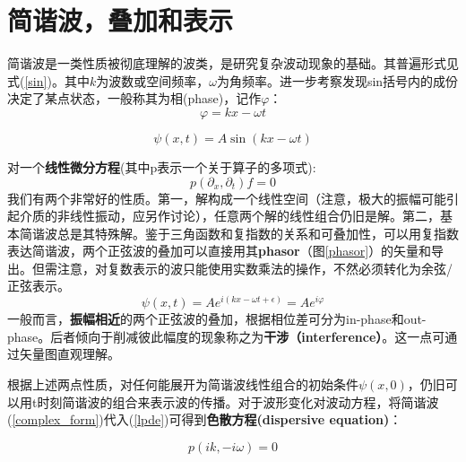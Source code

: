 \documentclass[12pt]{ctexart}%
\begin{document}
\section*{简谐波，叠加和表示}
简谐波是一类性质被彻底理解的波类，是研究复杂波动现象的基础。其普遍形式见式(\ref{sin})。其中$k$为波数或空间频率，$\omega$为角频率。进一步考察发现sin括号内的成份决定了某点状态，一般称其为相(phase)，记作$\varphi$：
\begin{equation}
    \varphi=kx-\omega t
\end{equation}

\begin{framed}
\begin{equation}
    \psi(x,t)=A\sin(kx-\omega t)
    \label{sin}
\end{equation}
\end{framed}
对一个\textbf{线性微分方程}(其中p表示一个关于算子的多项式):
\begin{equation}
    p(\partial_x,\partial_t)f=0
    \label{lpde}
\end{equation}
我们有两个非常好的性质。第一，解构成一个线性空间（注意，极大的振幅可能引起介质的非线性振动，应另作讨论），任意两个解的线性组合仍旧是解。第二，基本简谐波总是其特殊解。鉴于三角函数和复指数的关系和可叠加性，可以用复指数表达简谐波，两个正弦波的叠加可以直接用其\textbf{phasor}（图\ref{phasor}）的矢量和导出。但需注意，对复数表示的波只能使用实数乘法的操作，不然必须转化为余弦/正弦表示。
\begin{equation}
    \psi(x,t)=Ae^{i(kx-\omega t+\epsilon)}=Ae^{i\varphi}
    \label{complex_form}
\end{equation}
一般而言，\textbf{振幅相近}的两个正弦波的叠加，根据相位差可分为in-phase和out-phase。后者倾向于削减彼此幅度的现象称之为\textbf{干涉（interference）}。这一点可通过矢量图直观理解。
\par 根据上述两点性质，对任何能展开为简谐波线性组合的初始条件$\psi(x,0)$，仍旧可以用t时刻简谐波的组合来表示波的传播。对于波形变化对波动方程，将简谐波(\ref{complex_form})代入(\ref{lpde})可得到\textbf{色散方程(dispersive equation)}：
\begin{framed}
    \begin{equation}
        p(ik,-i\omega)=0
        \label{dispersive_equation}
    \end{equation}
\end{framed}
\end{document}

